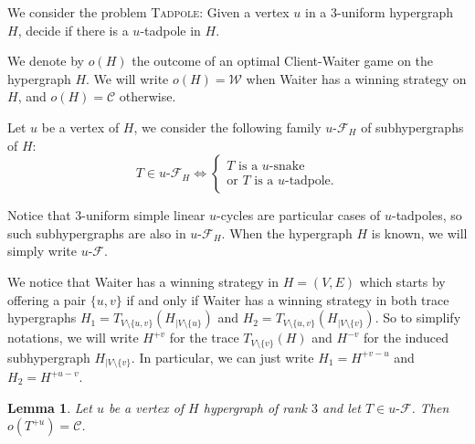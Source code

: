 \documentclass{article}
\newcommand{\Client}{\mathcal{C}}
\newcommand{\Waiter}{\mathcal{W}}
\newcommand{\uCwin}{u\text{-}\mathcal{F}}
\newtheorem{lemma}[theorem]{Lemma}
\begin{document}
We consider the problem \textsc{Tadpole}: Given a vertex \(u\) in a \(3\)-uniform hypergraph \(H\), decide if there is a \(u\)-tadpole in \(H\).

We denote by \(o(H)\) the outcome of an optimal Client-Waiter game on the hypergraph \(H\). We will write \(o(H)= \Waiter\) when Waiter has a winning strategy on \(H\), and \(o(H) = \Client\) otherwise.


















Let \(u\) be a vertex of \(H\), we consider the following family \(\uCwin_H\) of subhypergraphs of \(H\):
\[
	T \in \uCwin_H \iff \begin{cases}
T \text{ is a } u\text{-snake} \\
			\text{or } T \text{ is a } u\text{-tadpole}.
		\end{cases}
\]

Notice that \(3\)-uniform simple linear \(u\)-cycles are particular cases of \(u\)-tadpoles, so such subhypergraphs are also in \(\uCwin_H\). When the hypergraph \(H\) is known, we will simply write \(\uCwin\).

We notice that Waiter has a winning strategy in \(H=(V,E)\) which starts by offering a pair \(\{u,v\}\) if and only if Waiter has a winning strategy in both trace hypergraphs \(H_1 = T_{V \setminus \{u,v\}}(H_{| V \setminus \{u\}})\) and \(H_2 = T_{V \setminus \{u,v\}}(H_{| V \setminus \{v\}})\). So to simplify notations, we will write \(H^{+v}\) for the trace \(T_{V\setminus\{v\}}(H)\) and \(H^{-v}\) for the induced subhypergraph \(H_{|V\setminus \{v\}}\). In particular, we can just write \(H_1 = H^{+v-u}\) and \(H_2 = H^{+u-v}\).







\begin{lemma}\label{lem:gTadpoleCwin}
	Let \(u\) be a vertex of \(H\) hypergraph of rank \(3\) and let \(T \in \uCwin\). Then \(o(T^{+u}) = \Client\).
\end{lemma}
\end{document}
